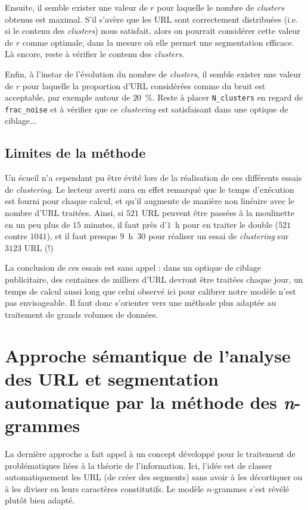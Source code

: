 \documentclass[11pt, a4paper]{article}
\begin{document}
Ensuite, il semble exister une valeur de $r$ pour laquelle le nombre de \textit{clusters} obtenus est maximal. S'il s'avère que les URL sont correctement distribuées (i.e. si le contenu des \textit{clusters}) nous satisfait, alors on pourrait considérer cette valeur de $r$ comme optimale, dans la mesure où elle permet une segmentation efficace. Là encore, reste à vérifier le contenu des \textit{clusters}.

Enfin, à l'instar de l'évolution du nombre de \textit{clusters}, il semble exister une valeur de $r$ pour laquelle la proportion d'URL considérées comme du bruit est acceptable, par exemple autour de $20$~\%. Reste à placer \texttt{N\_clusters} en regard de \texttt{frac\_noise} et à vérifier que ce \textit{clustering} est satisfaisant dans une optique de ciblage...

\subsection{Limites de la méthode}

Un écueil n'a cependant pu être évité lors de la réalisation de ces différents essais de \textit{clustering}. Le lecteur averti aura en effet remarqué que le temps d'exécution est fourni pour chaque calcul, et qu'il augmente de manière non linéaire avec le nombre d'URL traitées. Ainsi, si $521$ URL peuvent être passées à la moulinette en un peu plus de $15$ minutes, il faut près d'$1$~h pour en traiter le double ($521$ contre $1041$), et il faut presque $9$~h~$30$ pour réaliser un essai de \textit{clustering} sur $3123$ URL (!) 

La conclusion de ces essais est sans appel : dans un optique de ciblage publicitaire, des centaines de milliers d'URL devront être traitées chaque jour, un temps de calcul aussi long que celui observé ici pour calibrer notre modèle n'est pas envisageable. Il faut donc s'orienter vers une méthode plus adaptée au traitement de grands volumes de données.

\section{Approche sémantique de l'analyse des URL et segmentation automatique par la méthode des \textit{n}-grammes}

La dernière approche a fait appel à un concept développé pour le traitement de problématiques liées à la théorie de l'information. Ici, l'idée est de classer automatiquement les URL (de créer des segments) sans avoir à les décortiquer ou à les diviser en leurs caractères constitutifs. Le modèle $n$-grammes s'est révélé plutôt bien adapté.
\end{document}
